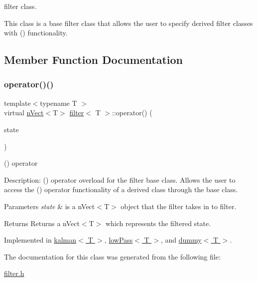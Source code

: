 filter class. 

This class is a base filter class that allows the user to specify derived filter classes with () functionality. 

\subsection{Member Function Documentation}
\mbox{\label{classfilter_ac8ec0fb4a10d10ee5e3133259610e0d2}} 
\subsubsection{\texorpdfstring{operator()()}{operator()()}}
{\footnotesize\ttfamily template$<$typename T $>$ \\
virtual \hyperlink{classnVect}{n\+Vect}$<$T$>$ \hyperlink{classfilter}{filter}$<$ T $>$\+::operator() (\begin{DoxyParamCaption}\item[{\hyperlink{classnVect}{n\+Vect}$<$ T $>$ \&}]{state }\end{DoxyParamCaption})\hspace{0.3cm}{\ttfamily [pure virtual]}}



() operator 

Description\+: () operator overload for the filter base class. Allows the user to access the () operator functionality of a derived class through the base class. 
\begin{DoxyParams}{Parameters}
{\em state} & is a n\+Vect$<$\+T$>$ object that the filter takes in to filter. \\
\hline
\end{DoxyParams}
\begin{DoxyReturn}{Returns}
Returns a n\+Vect$<$\+T$>$ which represents the filtered state. 
\end{DoxyReturn}


Implemented in \hyperlink{classkalman_ae3c0c97ba8c3eb2eba0134a3adf701ed}{kalman$<$ T $>$}, \hyperlink{classlowPass_a4d4458814fd69f87c5622227f6527468}{low\+Pass$<$ T $>$}, and \hyperlink{classdummy_a437aae6ce48cad80944cb578aa0c0218}{dummy$<$ T $>$}.



The documentation for this class was generated from the following file\+:\begin{DoxyCompactItemize}
\item 
\hyperlink{filter_8h}{filter.\+h}\end{DoxyCompactItemize}
